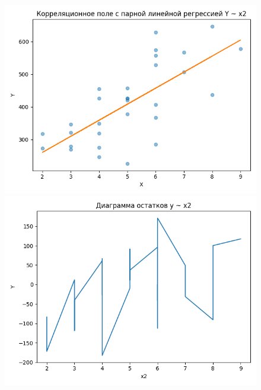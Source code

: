 \begin{figure}[H]
	\begin{minipage}[H]{0.32\linewidth}
		\begin{center}
			\includegraphics[width=\linewidth]{figures/lin_reg_y_x2}
		\end{center}
	\end{minipage}
	\hfill
	\begin{minipage}[H]{0.32\linewidth}
		\begin{center}
			\includegraphics[width=\linewidth]{figures/res_plot_x2}
		\end{center}
	\end{minipage}
	\hfill
	\begin{minipage}[H]{0.32\linewidth}

\end{minipage}
\end{figure}
